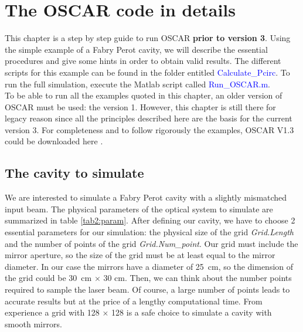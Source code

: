 \chapter{The OSCAR code in details}
\label{chap2}

This chapter is a step by step guide to run OSCAR \textbf{prior to version 3}. Using the simple example of a Fabry Perot cavity, we will describe the essential procedures and give some hints in order to obtain valid results. The different scripts for this example can be found in the folder entitled \textcolor{blue}{Calculate\_Pcirc}. To run the full simulation, execute the Matlab script called \textcolor{blue}{Run\_OSCAR.m}.\\

To be able to run all the examples quoted in this chapter, an older version of OSCAR must be used: the version 1. However, this chapter is still there for legacy reason since all the principles described here are the basis for the current version 3. For completeness and to follow rigorously the examples, OSCAR V1.3 could be downloaded here \cite{OS_down}.


\section{The cavity to simulate}
\label{chap2:1}
We are interested to simulate a Fabry Perot cavity with a slightly mismatched input beam. The physical parameters of the optical system to simulate are summarized in table \ref{tab2:param}. After defining our cavity, we have to choose 2 essential parameters for our simulation: the physical size of the grid \textsl{Grid.Length} and the number of points of the grid \textsl{Grid.Num\_point}. Our grid must include the mirror aperture, so the size of the grid must be at least equal to the mirror diameter. In our case the mirrors have a diameter of 25~cm, so the dimension of the grid could be 30~cm $\times$ 30 cm. Then, we can think about the number points required to sample the laser beam. Of course, a large number of points leads to accurate results but at the price of a lengthy computational time. From experience a grid with 128 $\times$ 128 is a safe choice to simulate a cavity with smooth mirrors.

